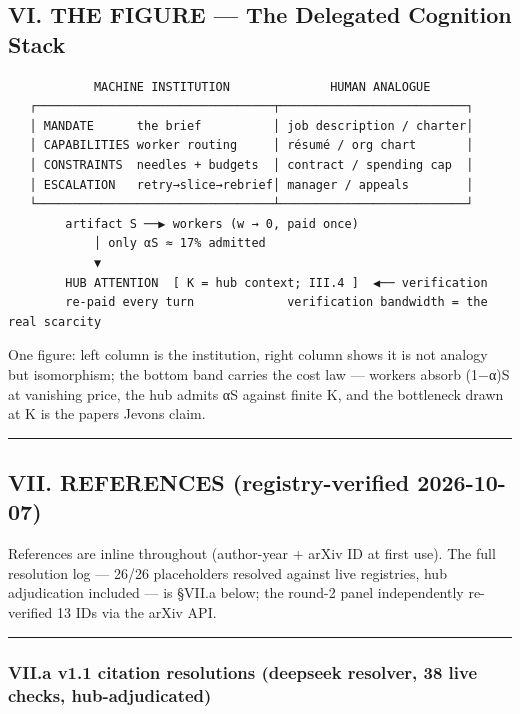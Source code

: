 \documentclass[
]{article}
\begin{document}
\subsection{VI. THE FIGURE --- The Delegated Cognition
Stack}\label{vi-the-figure--the-delegated-cognition-stack}

\begin{verbatim}
            MACHINE INSTITUTION              HUMAN ANALOGUE
   ┌─────────────────────────────────┬──────────────────────────┐
   │ MANDATE      the brief          │ job description / charter│
   │ CAPABILITIES worker routing     │ résumé / org chart       │
   │ CONSTRAINTS  needles + budgets  │ contract / spending cap  │
   │ ESCALATION   retry→slice→rebrief│ manager / appeals        │
   └─────────────────────────────────┴──────────────────────────┘
        artifact S ──▶ workers (w → 0, paid once)
            │ only αS ≈ 17% admitted
            ▼
        HUB ATTENTION  [ K = hub context; III.4 ]  ◀── verification
        re-paid every turn             verification bandwidth = the real scarcity
\end{verbatim}

One figure: left column is the institution, right column shows it is not
analogy but isomorphism; the bottom band carries the cost law ---
workers absorb (1−α)S at vanishing price, the hub admits αS against
finite K, and the bottleneck drawn at K is the paper\textquotesingle s
Jevons claim.

\begin{center}\rule{0.5\linewidth}{0.5pt}\end{center}

\subsection{VII. REFERENCES (registry-verified
2026-10-07)}\label{vii-references-registry-verified-2026-10-07}

References are inline throughout (author-year + arXiv ID at first use).
The full resolution log --- 26/26 placeholders resolved against live
registries, hub adjudication included --- is §VII.a below; the round-2
panel independently re-verified 13 IDs via the arXiv API.

\begin{center}\rule{0.5\linewidth}{0.5pt}\end{center}

\subsubsection{VII.a v1.1 citation resolutions (deepseek resolver, 38
live checks,
hub-adjudicated)}\label{viia-v11-citation-resolutions-deepseek-resolver-38-live-checks-hub-adjudicated}
\end{document}
